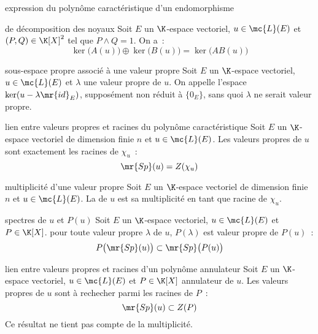 \begin{adjustwidth}{-3cm}{-3cm}
\begin{proposition}{5.44}{expression du polynôme caractéristique d'un endomorphisme}
\end{proposition}

\begin{theoreme}{5.47}{de décomposition des noyaux}
    Soit $E$ un $\K$-espace vectoriel, $u \in \mc{L}(E)$ et $(P,Q) \in \K[X]^2$ tel que $P \wedge Q = 1$. On a~:
    $$\ker\big(A(u)\big) \oplus \ker\big(B(u) \big) = \ker\big(AB(u)\big) $$
\end{theoreme}

\begin{definition}{5.49}{sous-espace propre associé à une valeur propre}
    Soit $E$ un $\K$-espace vectoriel, $u \in \mc{L}(E)$ et $\lambda$ une valeur propre de $u$. On appelle  l'espace $\ker(u - \lambda \mr{id}_E)$, supposément non réduit à $\{0_E\}$, sans quoi $\lambda$ ne serait valeur propre.
\end{definition}

\begin{theoreme}{5.52}{lien entre valeurs propres et racines du polynôme caractéristique}
    Soit $E$ un $\K$-espace vectoriel de dimension finie $n$ et $u \in \mc{L}(E)$. Les valeurs propres de $u$ sont exactement les racines de $\chi_u$~:
    $$\mr{Sp}(u) = Z(\chi_u)$$
\end{theoreme}

\begin{definition}{5.53}{multiplicité d'une valeur propre}
    Soit $E$ un $\K$-espace vectoriel de dimension finie $n$ et $u \in \mc{L}(E)$. La  de $u$ est sa multiplicité en tant que racine de $\chi_u$.
\end{definition}

\begin{theoreme}{5.63}{spectres de $u$ et $P(u)$}
    Soit $E$ un $\K$-espace vectoriel, $u \in \mc{L}(E)$ et $P \in \K[X]$. pour toute valeur propre $\lambda$ de $u$, $P(\lambda)$ est valeur propre de $P(u)$~:
    $$P\big(\mr{Sp}(u)\big) \subset \mr{Sp}\big(P(u)\big)$$
\end{theoreme}

\begin{proposition}{5.64}{lien entre valeurs propres et racines d'un polynôme annulateur}
    Soit $E$ un $\K$-espace vectoriel, $u \in \mc{L}(E)$ et $P \in \K[X]$ annulateur de $u$. Les valeurs propres de $u$ sont à rechecher parmi les racines de $P$~:
    $$\mr{Sp}(u) \subset Z(P)$$
    Ce résultat ne tient pas compte de la multiplicité.
\end{proposition}


\end{adjustwidth}
